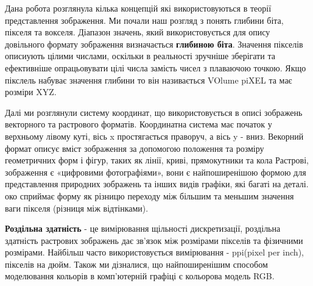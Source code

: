 \Conclusion %

Дана робота розглянула кілька концепцій які використовуються в теорії представлення зображення.
Ми почали наш розгляд з понять глибини біта, пікселя та вокселя.
Діапазон значень, який використовується для опису довільного формату зображення визначається \textbf{глибиною біта}.
Значення пікселів описиують цілими числами, оскільки в реальності зручніше зберігати та ефективніше опрацьовувати цілі числа замість чисел з плаваючою точкою.
Якщо пікслель набуває значення глибини то він називається VOlume piXEL та має розміри XYZ.

Далі ми розглянули систему координат, що використовується в описі зображень векторного та растрового форматів.
Координатна система має початок у верхньому лівому куті, вісь x простягається праворуч, а вісь y - вниз.
Векорний формат описує вміст зображення за допомогою положення та розміру геометричних форм і фігур, таких як лінії, криві, прямокутники та кола
Растрові, зображення є «цифровими фотографіями», вони є найпоширенішою формою для представлення природних зображень та інших видів графіки, які багаті на деталі.
око сприймає форму як різницю переходу між більшим та меньшим значення ваги пікселя (різниця між відтінками).

\textbf{Роздільна здатність} - це вимірювання щільності дискретизації, роздільна здатність растрових зображень дає зв'язок між розмірами пікселів та фізичними розмірами.
Найбільш часто використовується вимірювання - ppi(pixel per inch), пікселів на дюйм.
Також ми дізналися, що найпоширенішим способом моделювання кольорів в комп'ютерній графіці є кольорова модель RGB.
